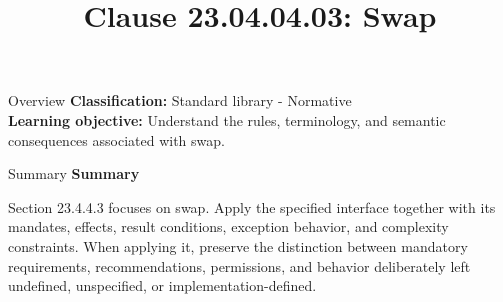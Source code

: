 \documentclass[10pt,letterpaper]{article}
\title{Clause 23.04.04.03: Swap}
\author{}
\date{}
\begin{document}
\maketitle
\begin{CornellOverviewBox}{Overview}
\textbf{Classification:} Standard library - Normative\\[2pt]
\textbf{Learning objective:} Understand the rules, terminology, and semantic consequences associated with swap.
\end{CornellOverviewBox}\begin{CornellSummaryBox}{Summary}
{\sffamily\bfseries\color{Accent} Summary}\par\vspace{3pt}Section 23.4.4.3 focuses on swap. Apply the specified interface together with its mandates, effects, result conditions, exception behavior, and complexity constraints. When applying it, preserve the distinction between mandatory requirements, recommendations, permissions, and behavior deliberately left undefined, unspecified, or implementation-defined.
\end{CornellSummaryBox}
\end{document}
